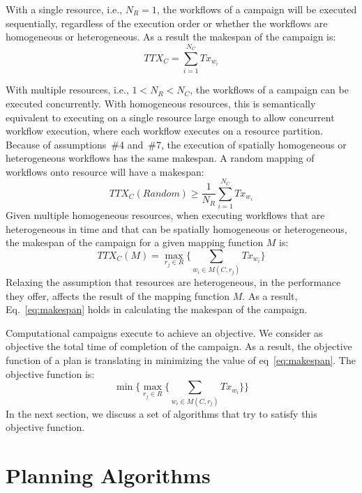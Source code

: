 With a single resource, i.e., $N_{R} = 1$, the workflows of a campaign will be executed sequentially, regardless of the execution order or whether the workflows are homogeneous or heterogeneous.
As a result the makespan of the campaign is:
\begin{equation}
   TTX_{C} = \sum_{i=1}^{N_{C}}Tx_{w_{i}} 
\end{equation}

With multiple resources, i.e., $1 < N_{R} < N_{C}$, the workflows of a campaign can be executed concurrently.
With homogeneous resources, this is semantically equivalent to executing on a single resource large enough to allow concurrent workflow execution, where each workflow executes on a resource partition. 
Because of assumptions~\#4 and~\#7, the execution of spatially homogeneous or heterogeneous workflows has the same makespan.
A random mapping of workflows onto resource will have a makespan:
\begin{equation}
   TTX_{C}(Random) \geq \frac{1}{N_{R}}\sum_{i=1}^{N_{C}} Tx_{w_{i}} 
\end{equation}
Given multiple homogeneous resources, when executing workflows that are heterogeneous in time and that can be spatially homogeneous or heterogeneous, the makespan of the campaign for a given mapping function $ M $ is:
\begin{equation}
TTX_{C}(M) = \max_{r_{j}\in R}\Big\{\sum_{w_{i}\in M(C,r_{j})}Tx_{w_{i}}\Big\}
\label{eq:makespan}
\end{equation}
Relaxing the assumption that resources are heterogeneous, in the performance they offer, affects the result of the mapping function $ M $.
As a result, Eq.~\ref{eq:makespan} holds in calculating the makespan of the campaign.

Computational campaigns execute to achieve an objective.
We consider as objective the total time of completion of the campaign.
As a result, the objective function of a plan is translating in minimizing the value of eq~\ref{eq:makespan}.
The objective function is:
\begin{equation}
    \min\Big\{\max_{r_{j}\in R}\Big\{\sum_{w_{i}\in M(C,r_{j})}Tx_{w_{i}}\Big\}\Big\}
\end{equation}
In the next section, we discuss a set of algorithms that try to satisfy this objective function.

\section{Planning Algorithms}
\label{sec:algo}

